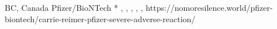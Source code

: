           {
            BC, Canada
          }
          {
          }
          {
            Pfizer/BioNTech
          }
          {
            *
          }
          {
            ,
            ,
            ,
            ,
            ,
          }
          {
            https://nomoresilence.world/pfizer-biontech/carrie-reimer-pfizer-severe-adverse-reaction/
          }

